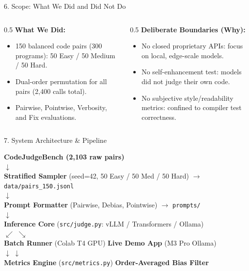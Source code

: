 \documentclass[aspectratio=169]{beamer}
\begin{document}
\begin{frame}{6. Scope: What We Did and Did Not Do}
  \begin{columns}
    \begin{column}{0.5\textwidth}
      \textbf{What We Did:}
      \begin{itemize}
        \item 150 balanced code pairs (300 programs): 50 Easy / 50 Medium / 50 Hard.
        \item Dual-order permutation for all pairs (2,400 calls total).
        \item Pairwise, Pointwise, Verbosity, and Fix evaluations.
      \end{itemize}
    \end{column}
    \begin{column}{0.5\textwidth}
      \textbf{Deliberate Boundaries (Why):}
      \begin{itemize}
        \item No closed proprietary APIs: focus on local, edge-scale models.
        \item No self-enhancement test: models did not judge their own code.
        \item No subjective style/readability metrics: confined to compiler test correctness.
      \end{itemize}
    \end{column}
  \end{columns}
\end{frame}

\begin{frame}{7. System Architecture \& Pipeline}
  \begin{center}
    \small
    \textbf{CodeJudgeBench (2,103 raw pairs)} \\
    $\downarrow$ \\
    \textbf{Stratified Sampler} (seed=42, 50 Easy / 50 Med / 50 Hard) $\rightarrow$ \texttt{data/pairs\_150.jsonl} \\
    $\downarrow$ \\
    \textbf{Prompt Formatter} (Pairwise, Debias, Pointwise) $\rightarrow$ \texttt{prompts/} \\
    $\downarrow$ \\
    \textbf{Inference Core} (\texttt{src/judge.py}: vLLM / Transformers / Ollama) \\
    $\swarrow$ \hspace{2cm} $\searrow$ \\
    \textbf{Batch Runner} (Colab T4 GPU) \hspace{1cm} \textbf{Live Demo App} (M3 Pro Ollama) \\
    $\downarrow$ \hspace{4cm} $\downarrow$ \\
    \textbf{Metrics Engine} (\texttt{src/metrics.py}) \hspace{1cm} \textbf{Order-Averaged Bias Filter}
  \end{center}
\end{frame}
\end{document}
